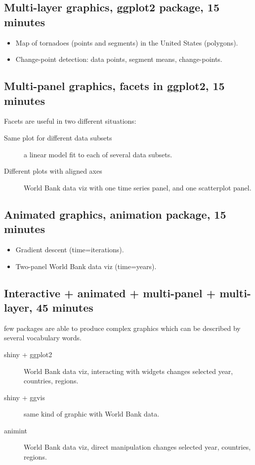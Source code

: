 \documentclass[11pt]{article}
\begin{document}
\subsection*{Multi-layer graphics, ggplot2 package, 15 minutes}
\begin{itemize}
\item Map of tornadoes (points and segments) in the United States (polygons).
\item Change-point detection: data points, segment means,
  change-points.
\end{itemize}

\subsection*{Multi-panel graphics, facets in ggplot2, 15 minutes}
Facets are useful in two different situations:
\begin{description}
\item[{Same plot for different data subsets}] a linear model fit to each
  of several data subsets.
\item[{Different plots with aligned axes}] World Bank data viz with one
  time series panel, and one scatterplot panel.
\end{description}

\subsection{Animated graphics, animation package, 15 minutes}
\begin{itemize}
\item Gradient descent (time=iterations).
\item Two-panel World Bank data viz (time=years).
\end{itemize}

\subsection{Interactive + animated + multi-panel + multi-layer, 45 minutes}
few packages are able to produce complex graphics which can be
described by several vocabulary words.
\begin{description}
\item[{shiny + ggplot2}] World Bank data viz, interacting with widgets
changes selected year, countries, regions.
\item[{shiny + ggvis}] same kind of graphic with World Bank data.
\item[{animint}] World Bank data viz, direct manipulation changes
selected year, countries, regions.
\end{description}
\end{document}
